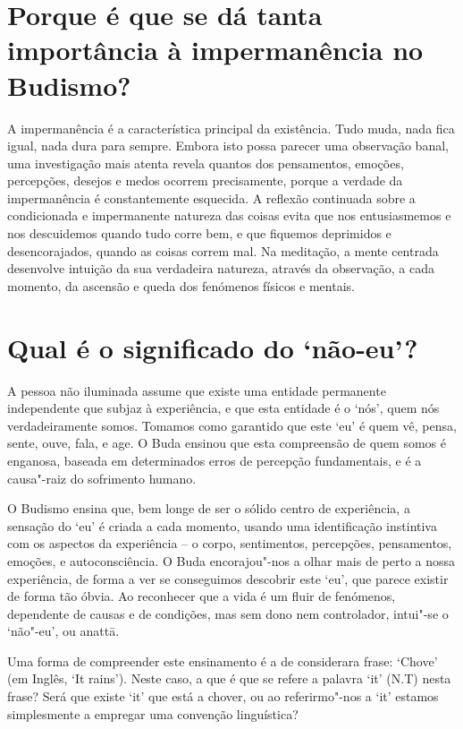 \section{Porque é que se dá tanta importância à impermanência no Budismo?}

A impermanência é a característica principal da existência. Tudo muda,
nada fica igual, nada dura para sempre. Embora isto possa parecer uma
observação banal, uma investigação mais atenta revela quantos dos
pensamentos, emoções, percepções, desejos e medos ocorrem precisamente,
porque a verdade da impermanência é constantemente esquecida. A reflexão
continuada sobre a condicionada e impermanente natureza das coisas evita
que nos entusiasmemos e nos descuidemos quando tudo corre bem, e que
fiquemos deprimidos e desencorajados, quando as coisas correm mal. Na
meditação, a mente centrada desenvolve intuição da sua verdadeira
natureza, através da observação, a cada momento, da ascensão e queda dos
fenómenos físicos e mentais.

\section{Qual é o significado do `não-eu'?}

A pessoa não iluminada assume que existe uma entidade permanente
independente que subjaz à experiência, e que esta entidade é o `nós',
quem nós verdadeiramente somos. Tomamos como garantido que este `eu' é
quem vê, pensa, sente, ouve, fala, e age. O Buda ensinou que esta
compreensão de quem somos é enganosa, baseada em determinados erros de
percepção fundamentais, e é a causa"-raiz do sofrimento humano.

O Budismo ensina que, bem longe de ser o sólido centro de experiência, a
sensação do `eu' é criada a cada momento, usando uma identificação
instintiva com os aspectos da experiência -- o corpo, sentimentos,
percepções, pensamentos, emoções, e autoconsciência. O Buda
encorajou"-nos a olhar mais de perto a nossa experiência, de forma a ver
se conseguimos descobrir este `eu', que parece existir de forma tão
óbvia. Ao reconhecer que a vida é um fluir de fenómenos, dependente de
causas e de condições, mas sem dono nem controlador, intui"-se o
`não"-eu', ou anattā.

Uma forma de compreender este ensinamento é a de considerara frase:
`Chove' (em Inglês, `It rains'). Neste caso, a que é que se refere a
palavra `it' (N.T) nesta frase? Será que existe `it' que está a chover,
ou ao referirmo"-nos a `it' estamos simplesmente a empregar uma convenção
linguística?

